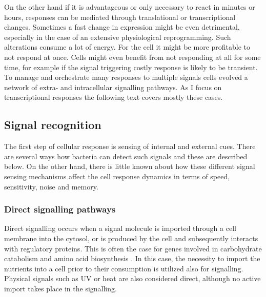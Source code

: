 On the other hand if it is advantageous or only necessary to react in minutes or hours, responses can be mediated through translational or transcriptional changes.
Sometimes a fast change in expression might be even detrimental, especially in the case of an extensive physiological reprogramming.
Such alterations consume a lot of energy.
For the cell it might be more profitable to not respond at once.
Cells might even benefit from not responding at all for some time, for example if the signal triggering costly response is likely to be transient.
To manage and orchestrate many responses to multiple signals cells evolved a network of extra- and intracellular signalling pathways.
As I focus on transcriptional responses the following text covers mostly these cases.

\subsection{Signal recognition}
The first step of cellular response is sensing of internal and external cues.
There are several ways how bacteria can detect such signals and these are described below.
On the other hand, there is little known about how these different signal sensing mechanisms affect the cell response dynamics in terms of speed, sensitivity, noise and memory.

\subsubsection{Direct signalling pathways}
Direct signalling occurs when a signal molecule is imported through a cell membrane into the cytosol, or is produced by the cell and subsequently interacts with regulatory proteins.
This is often the case for genes involved in carbohydrate catabolism and amino acid biosynthesis \cite{charlier1992arginine, weickert1992isorepressor, pittard1996various, wheatley2013structural}.
In this case, the necessity to import the nutrients into a cell prior to their consumption is utilized also for signalling.
Physical signals such as UV or heat are also considered direct, although no active import takes place in the signalling.

